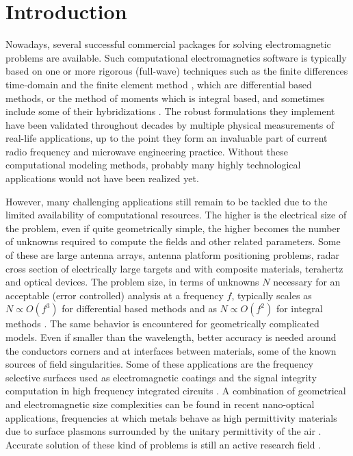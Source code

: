 \chapter{Introduction} \label{chap:INT}

Nowadays, several successful commercial packages for solving electromagnetic problems are available. Such computational electromagnetics software is typically based on one or more  rigorous (full-wave) techniques such as the finite differences time-domain \cite{CSTMWS, SEMCADX} and the finite element method \cite{ComsolRF, HFSS}, which are differential based methods, or the method of moments \cite{FEKO} which is integral based, and sometimes include some of their hybridizations \cite{Garg2008, Davidson2011, RIB2011}. The robust formulations they implement have been validated throughout decades by multiple physical measurements of real-life applications, up to the point they form an invaluable part of current radio frequency and microwave engineering practice. Without these computational modeling methods, probably many highly technological applications would not have been realized yet.

However, many challenging applications still remain to be tackled due to the limited availability of computational resources. The higher is the electrical size of the problem, even if quite geometrically simple, the higher becomes the number of unknowns required to compute the fields and other related parameters. Some of these are large antenna arrays, antenna platform positioning problems, radar cross section of electrically large targets and with composite materials, terahertz and optical devices. The problem size, in terms of unknowns $N$ necessary for an acceptable (error controlled) analysis at a frequency $f$, typically scales as $N \propto O(f^3)$ for differential based methods and as $N \propto O(f^2)$ for integral methods \cite{lee2011maturity}. The same behavior is encountered for geometrically complicated models. Even if smaller than the wavelength, better accuracy is needed around the conductors corners and at interfaces between materials, some of the known sources of field singularities. Some of these applications are the frequency selective surfaces used as electromagnetic coatings and the signal integrity computation in high frequency integrated circuits \cite{lee2011maturity, mittra2004look}. A combination of geometrical and electromagnetic size complexities can be found in recent nano-optical applications, frequencies at which metals behave as high permittivity materials due to surface plasmons surrounded by the unitary permittivity of the air \cite{tsukerman2008computational}. Accurate solution of these kind of problems is still an active research field \cite{tsukerman1998comparison}.

